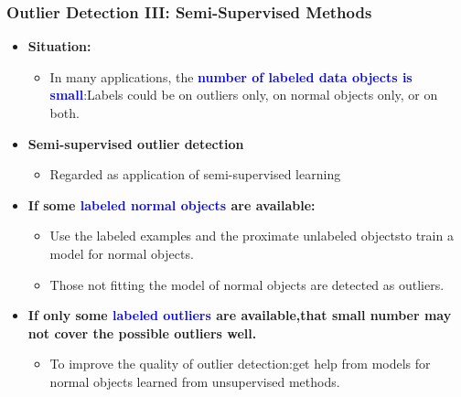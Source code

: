\documentclass[aspectratio=169,t,xcolor=dvipsnames]{beamer}
\newcommand{\blue}[1]{\textbf{\textcolor{blue}{#1}}}
\begin{document}
\begin{frame}
	\frametitle{Outlier Detection III: Semi-Supervised Methods }
	\begin{itemize}
		\item \textbf{Situation:}
		      \begin{itemize}
		      	\item In many applications, the \blue{number of labeled data objects is small}:Labels could be on outliers only, on normal objects only, or on both.
		      \end{itemize}
		\item \textbf{Semi-supervised outlier detection}
		      \begin{itemize}
		      	\item Regarded as application of semi-supervised learning
		      \end{itemize}
		\item \textbf{If some \blue{labeled normal objects} are available:}
		      \begin{itemize}
		      	\item Use the labeled examples and the proximate unlabeled objectsto train a model for normal objects.
		      	\item Those not fitting the model of normal objects are detected as outliers.
		      \end{itemize}
		\item \textbf{If only some \blue{labeled outliers} are available,that small number may not cover the possible outliers well.}
		      \begin{itemize}
		      	\item To improve the quality of outlier detection:get help from models for normal objects learned from unsupervised methods.
		      \end{itemize}
	\end{itemize}
\end{frame}

%
\end{document}
